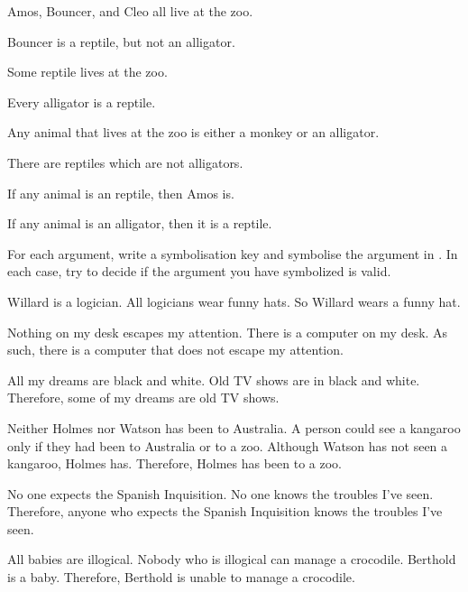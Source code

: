 \begin{earg}
\item Amos, Bouncer, and Cleo all live at the zoo. 
\item Bouncer is a reptile, but not an alligator. 
\item Some reptile lives at the zoo. 
\item Every alligator is a reptile. 
\item Any animal that lives at the zoo is either a monkey or an alligator. 
\item There are reptiles which are not alligators.
\item If any animal is an reptile, then Amos is.
\item If any animal is an alligator, then it is a reptile.
\end{earg}


\problempart
\label{pr.FOLarguments}
For each argument, write a symbolisation key and symbolise the argument in \FOL. In each case, try to decide if the argument you have symbolized is valid.
\begin{earg}
\item Willard is a logician. All logicians wear funny hats. So Willard wears a funny hat.
\item Nothing on my desk escapes my attention. There is a computer on my desk. As such, there is a computer that does not escape my attention.
\item All my dreams are black and white. Old TV shows are in black and white. Therefore, some of my dreams are old TV shows.
\item Neither Holmes nor Watson has been to Australia. A person could see a kangaroo only if they had been to Australia or to a zoo. Although Watson has not seen a kangaroo, Holmes has. Therefore, Holmes has been to a zoo.
\item No one expects the Spanish Inquisition. No one knows the troubles I've seen. Therefore, anyone who expects the Spanish Inquisition knows the troubles I've seen.
\item All babies are illogical. Nobody who is illogical can manage a crocodile. Berthold is a baby. Therefore, Berthold is unable to manage a crocodile.
\end{earg}



